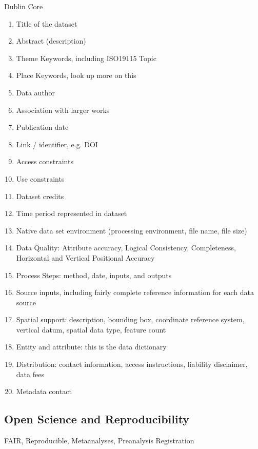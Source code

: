 \documentclass{isprs} %
\begin{document}
Dublin Core

\begin{enumerate}
\setlength\itemsep{0em}\setlength\parskip{0em}\setlength\topsep{0em}\setlength\partopsep{0em}\setlength\parsep{0em} 
\item{Title of the dataset} 
\item{Abstract (description)}
\item{Theme Keywords, including ISO19115 Topic}
\item{Place Keywords, look up more on this}
\item{Data author}
\item{Association with larger works}
\item{Publication date}
\item{Link / identifier, e.g. DOI}
\item{Access constraints}
\item{Use constraints}
\item{Dataset credits}
\item{Time period represented in dataset}
\item{Native data set environment (processing environment, file name, file size)}
\item{Data Quality: Attribute accuracy, Logical Consistency, Completeness, Horizontal and Vertical Positional Accuracy}
\item{Process Steps: method, date, inputs, and outputs}
\item{Source inputs, including fairly complete reference information for each data source}
\item{Spatial support: description, bounding box, coordinate reference system, vertical datum, spatial data type, feature count}
\item{Entity and attribute: this is the data dictionary}
\item{Distribution: contact information, access instructions, liability disclaimer, data fees}
\item{Metadata contact}
\end{enumerate}

\subsection{Open Science and Reproducibility}\label{sec:Metadata}

FAIR, Reproducible, Metaanalyses, Preanalysis Registration
\end{document}
